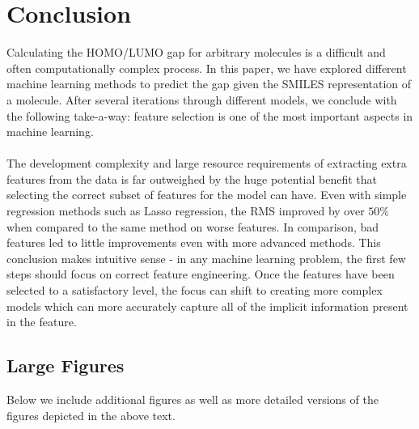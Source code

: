 \documentclass[letterpaper]{article}
\begin{document}
\section{Conclusion}
Calculating the HOMO/LUMO gap for arbitrary molecules is a difficult and often computationally complex process. In this paper, we have explored different machine learning methods to predict the gap given the SMILES representation of a molecule. After several iterations through different models, we conclude with the following take-a-way: feature selection is one of the most important aspects in machine learning.\\
\\
\noindent The development complexity and large resource requirements of extracting extra features from the data is far outweighed by the huge potential benefit that selecting the correct subset of features for the model can have. Even with simple regression methods such as Lasso regression, the RMS improved by over $50\%$ when compared to the same method on worse features. In comparison, bad features led to little improvements even with more advanced methods. This conclusion makes intuitive sense - in any machine learning problem, the first few steps should focus on correct feature engineering. Once the features have been selected to a satisfactory level, the focus can shift to creating more complex models which can more accurately capture all of the implicit information present in the feature.

\onecolumn

\subsection{Large Figures}
Below we include additional figures as well as more detailed versions of the figures depicted in the above text.
\end{document}
